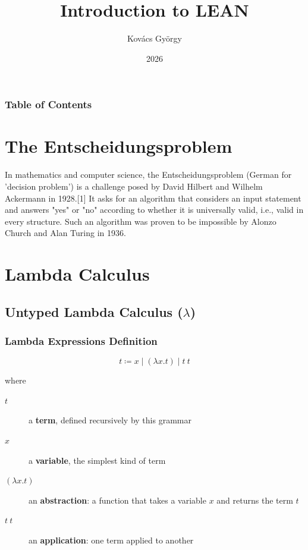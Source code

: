 \documentclass{beamer}
\title{Introduction to LEAN}
\author{Kovács György}
\institute{Lean Summer School}
\date{2026}
\begin{document}
\frame{\titlepage}

\begin{frame}
  \frametitle{Table of Contents}
  \tableofcontents
\end{frame}

\section{The Entscheidungsproblem}

\begin{frame}
  In mathematics and computer science, the Entscheidungsproblem (German for 'decision problem') is a challenge posed by David Hilbert and Wilhelm Ackermann in 1928.[1] It asks for an algorithm that considers an input statement and answers "yes" or "no" according to whether it is universally valid, i.e., valid in every structure. Such an algorithm was proven to be impossible by Alonzo Church and Alan Turing in 1936.
\end{frame}

\section{Lambda Calculus}

\subsection{Untyped Lambda Calculus ($\lambda$)}

\begin{frame}[fragile]
  \frametitle{Lambda Expressions Definition}

  $$ t \coloneqq x  \mid  (\lambda x . t)  \mid   t\  t $$

  where
  \begin{description}
    \item[$t$] a \textbf{term}, defined recursively by this grammar
    \item[$x$] a \textbf{variable}, the simplest kind of term
    \item[$(\lambda x . t)$] an \textbf{abstraction}: a function
      that takes a variable $x$ and returns the term $t$
    \item[$t\ t$] an \textbf{application}: one term applied to another
  \end{description}
\end{frame}
\end{document}
